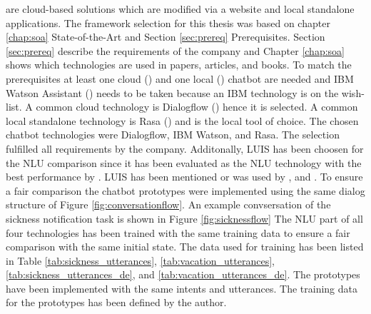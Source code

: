 are cloud-based solutions which are modified via a website and local standalone applications.
The framework selection for this thesis was based on chapter \ref{chap:soa} State-of-the-Art 
and Section \ref{sec:prereq} Prerequisites.
Section \ref{sec:prereq} describe the requirements of the company and Chapter \ref{chap:soa} shows which technologies are 
used in papers, articles, and books.
To match the prerequisites at least one cloud (\citet{braunEvaluatingNLU, rahman2017programming}) and one local (\citet{braunEvaluatingNLU}) chatbot are needed and IBM Watson Assistant (\citet{rahman2017programming, pharmacybot, ieee2018watson, gregori2017evaluation}) needs to be taken because an IBM technology is on the wish-list.
A common cloud technology is Dialogflow (\citet{braunEvaluatingNLU, dutta2017developing, singhbuilding, buiildChatbotsPython, rahman2017programming, ieee2018watson}) hence it is selected.
A common local standalone technology is Rasa (\citet{braunEvaluatingNLU, singhbuilding, rasabocklisch2017, buiildChatbotsPython, gregori2017evaluation}) and is the local tool of choice.
The chosen chatbot technologies were Dialogflow, IBM Watson, and Rasa.
The selection fulfilled all requirements by the company.
Additonally, LUIS\cite{luis2015williams} has been choosen for the NLU comparison since it 
has been evaluated as the NLU technology with the best performance by \citet{braunEvaluatingNLU}.
LUIS has been mentioned or was used by \citet{singhbuilding, buiildChatbotsPython, rahman2017programming, dutta2017developing}, 
and \citet{gregori2017evaluation}.
To ensure a fair comparison the chatbot prototypes were implemented using the same 
dialog structure of Figure \ref{fig:conversationflow}.
An example convsersation of the sickness notification task is shown in Figure \ref{fig:sicknessflow}
The NLU part of all four technologies has been trained with the same training data to 
ensure a fair comparison with the same initial state.
The data used for training has been listed in
Table \ref{tab:sickness_utterances}, \ref{tab:vacation_utterances}, \ref{tab:sickness_utterances_de}, 
and \ref{tab:vacation_utterances_de}.
The prototypes have been implemented with the same intents and utterances.
The training data for the prototypes has been defined by the author.
